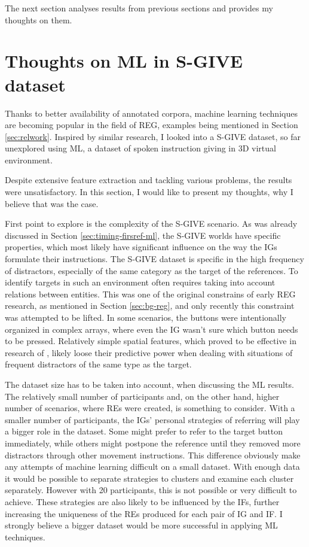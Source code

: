 The next section analyses results from previous sections and provides my thoughts on them.

\section{Thoughts on ML in S-GIVE dataset}
Thanks to better availability of annotated corpora, machine learning techniques are becoming popular in the field of REG, examples being mentioned in Section \ref{sec:relwork}. Inspired by similar research, I looked into a S-GIVE dataset, so far unexplored using ML, a dataset of spoken instruction giving in 3D virtual environment.

Despite extensive feature extraction and tackling various problems, the results were unsatisfactory. In this section, I would like to present my thoughts, why I believe that was the case.

First point to explore is the complexity of the S-GIVE scenario. As was already discussed in Section \ref{sec:timing-firsref-ml}, the S-GIVE worlds have specific properties, which most likely have significant influence on the way the IGs formulate their instructions. The S-GIVE dataset is specific in the high frequency of distractors, especially of the same category as the target of the references. To identify targets in such an environment often requires taking into account relations between entities. This was one of the original constrains of early REG research, as mentioned in Section \ref{sec:bg-reg}, and only recently this constraint was attempted to be lifted. In some scenarios, the buttons were intentionally organized in complex arrays, where even the IG wasn't sure which button needs to be pressed. Relatively simple spatial features, which proved to be effective in research of \citet{stoia2006sentence}, likely loose their predictive power when dealing with situations of frequent distractors of the same type as the target.

The dataset size has to be taken into account, when discussing the ML results. The relatively small number of participants and, on the other hand, higher number of scenarios, where REs were created, is something to consider. With a smaller number of participants, the IGs' personal strategies of referring will play a bigger role in the dataset. Some might prefer to refer to the target button immediately, while others might postpone the reference until they removed more distractors through other movement instructions. This difference obviously make any attempts of machine learning difficult on a small dataset. With enough data it would be possible to separate strategies to clusters and examine each cluster separately. However with 20 participants, this is not possible or very difficult to achieve. These strategies are also likely to be influenced by the IFs, further increasing the uniqueness of the REs produced for each pair of IG and IF. I strongly believe a bigger dataset would be more successful in applying ML techniques.

